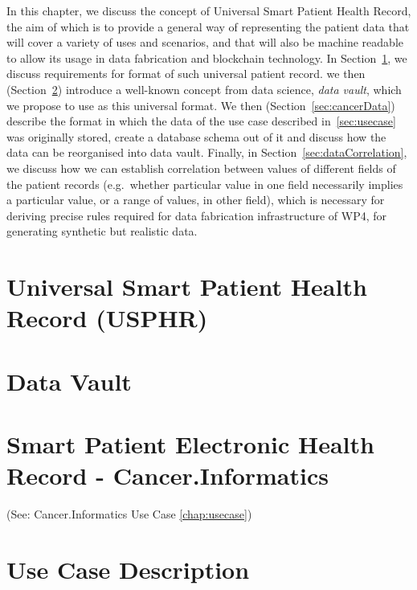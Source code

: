 In this chapter, we discuss the concept of Universal Smart Patient Health Record, the aim of which is to provide a general way of representing the patient data that will cover a variety of uses and scenarios, and that will also be machine readable to allow its usage in data fabrication and blockchain technology. In Section~\ref{sec:usphr}, we discuss requirements for format of such universal patient record. we then (Section~\ref{sec:dataVault}) introduce a well-known concept from data science, \emph{data vault}, which we propose to use as this universal format. We then (Section~\ref{sec:cancerData}) describe the format in which the data of the use case described in~\ref{sec:usecase} was originally stored, create a database schema out of it and discuss how the data can be reorganised into data vault. Finally, in Section~\ref{sec:dataCorrelation}, we discuss how we can establish correlation between values of different fields of the patient records (e.g.~whether particular value in one field necessarily implies a particular value, or a range of values, in other field), which is necessary for deriving precise rules required for data fabrication infrastructure of WP4, for generating synthetic but realistic data.

\section{Universal Smart Patient Health Record (USPHR)}
\label{sec:usphr}



\section{Data Vault}
\label{sec:dataVault}



\section{Smart Patient Electronic Health Record - Cancer.Informatics}

(See: Cancer.Informatics Use Case \ref{chap:usecase})

\section{Use Case Description}

